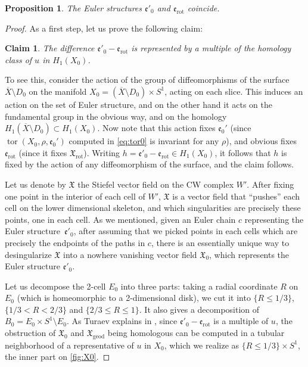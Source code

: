 \documentclass[JEP,XML,SOM,Unicode,NoFloatCountersInSection,published]{cedram}
\theoremstyle{plain}
\newtheorem{prop}[thm]{Proposition}
\newtheorem*{claim}{Claim}
\theoremstyle{definition}
\theoremstyle{remark}
\newcommand{\rot}{\mathrm{rot}}
\newcommand{\geod}{\mathrm{geod}}
\numberwithin{equation}{section}
\DeclareMathOperator{\tor}{tor}
\begin{document}
\begin{prop}\label{prop:euler}
The Euler structures $\mathfrak e'_0$ and $\mathfrak e_\rot$ coincide.
\end{prop}

\begin{proof}
As a first step, let us prove the following claim:
\begin{claim}
The difference $\mathfrak e'_0 - \mathfrak e_\rot$ is represented by a multiple of the homology class of $u$ in $H_1(X_0)$.
\end{claim}
To see this, consider the action of the group of diffeomorphisms of the surface $\overline X \setminus D_0$ on the manifold $X_0 = (\overline X \setminus D_0) \times S^1$, acting on each slice.
This induces an action on the set of Euler structure, and on the other hand it acts on the fundamental group in the obvious way, and on the homology $H_1(\overline X \setminus D_0) \subset H_1(X_0)$. Now note that this action fixes $\mathfrak e_0'$ (since $\tor(X_0, \rho, \mathfrak e_0')$ computed in \cref{eq:tor0} is invariant for any $\rho$), and obvious fixes $\mathfrak e_\rot$ (since it fixes $\mathfrak X_\rot$). Writing $h = \mathfrak e'_0 - \mathfrak e_\rot \in H_1(X_0)$, it follows that $h$ is fixed by the action of any diffeomorphism of the surface, and the claim follows.


Let us denote by $\mathfrak X$ the Stiefel vector field on the CW complex $W'$. After fixing one point in the interior of each cell of $W'$, $\mathfrak X$ is a vector field that ``pushes'' each cell on the lower dimensional skeleton, and which singularities are precisely these points, one in each cell. As we mentioned, given an Euler chain $c$ representing the Euler structure~$\mathfrak e'_0$, after assuming that we picked points in each cells which are precisely the endpoints of the paths in $c$, there is an essentially unique way to desingularize $\mathfrak X$ into a nowhere vanishing vector field $\mathfrak X_0$, which represents the Euler structure $\mathfrak e'_0$.

Let us decompose the 2-cell $E_0$ into three parts: taking a radial coordinate $R$ on $E_0$ (which is homeomorphic to a 2-dimensional disk), we cut it into $\{ R\!\le\! 1/3\}$, \hbox{$\{1/3 \!<\! R \!<\! 2/3\}$} and $\{2/3\!\le\! R \!\le\! 1\}$. It also gives a decomposition of \hbox{$B_0 \!=\! E_0 \!\times\! S^1 \!\setminus\! E_0$}.
As Turaev explains in \cite[\S 5.2]{Turaev}, since $\mathfrak e'_0 - \mathfrak e_\rot$ is a multiple of $u$, the obstruction of $\mathfrak X_0$ and $\mathfrak X_\geod$ being homologous can be computed in a tubular neighborhood of a representative of $u$ in $X_0$, which we realize as
$\{ R\le 1/3\} \times S^1$, the inner part on \cref{fig:X0}.


\end{proof}
\end{document}
